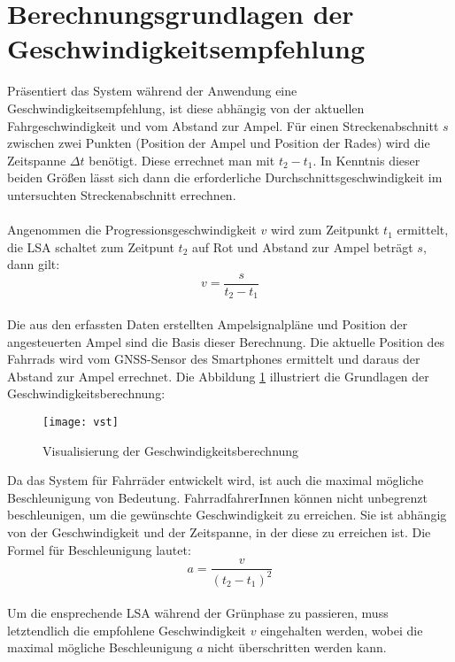 \section{\label{sec:mathGrundlagen}Berechnungsgrundlagen der Geschwindigkeitsempfehlung}
Präsentiert das System während der Anwendung eine Geschwindigkeitsempfehlung, ist diese abhängig von der aktuellen Fahrgeschwindigkeit und vom Abstand zur Ampel. Für einen Streckenabschnitt $s$ zwischen zwei Punkten (Position der Ampel und Position der Rades) wird die Zeitspanne $\Delta t$ benötigt. Diese errechnet man mit $t_{2} - t_{1}$. In Kenntnis dieser beiden Größen lässt sich dann die erforderliche Durchschnittsgeschwindigkeit im untersuchten Streckenabschnitt errechnen.\\\\ 
Angenommen die \gls{Progressionsgeschwindigkeit} $v$ wird zum Zeitpunkt $t_{1}$ ermittelt, die \gls {LSA} schaltet zum Zeitpunt $t_{2}$ auf Rot und Abstand zur Ampel beträgt $s$, dann gilt: \\
\[ v = \frac{s}{t_{2} - t_{1}} \] \\
Die aus den erfassten Daten erstellten Ampelsignalpläne und Position der angesteuerten Ampel sind die Basis dieser Berechnung. Die aktuelle Position des Fahrrads wird vom \gls{GNSS}-Sensor des \glspl{Smartphone} ermittelt und daraus der Abstand zur Ampel errechnet. Die Abbildung \ref{fig:vst} illustriert die Grundlagen der Geschwindigkeitsberechnung: \\
\begin{figure}[H]  
    \centering  
    \texttt{[image: vst]}  
    \grayRule
    \caption[Berechnung \gls{Progressionsgeschwindigkeit}]{Visualisierung der Geschwindigkeitsberechnung}
    \label{fig:vst}
\end{figure}
\clearpage
Da das System für Fahrräder entwickelt wird, ist auch die maximal mögliche Beschleunigung von Bedeutung. FahrradfahrerInnen können nicht unbegrenzt beschleunigen, um die gewünschte Geschwindigkeit zu erreichen. Sie ist abhängig von der Geschwindigkeit und der Zeitspanne, in der diese zu erreichen ist. Die Formel für Beschleunigung lautet:
\[ a = \frac{v}{(t_{2} - t_{1})^{2}} \]\\
 Um die ensprechende \gls{LSA} während der Grünphase zu passieren, muss letztendlich die empfohlene Geschwindigkeit $v$ eingehalten werden, wobei die maximal mögliche Beschleunigung $a$ nicht überschritten werden kann.
